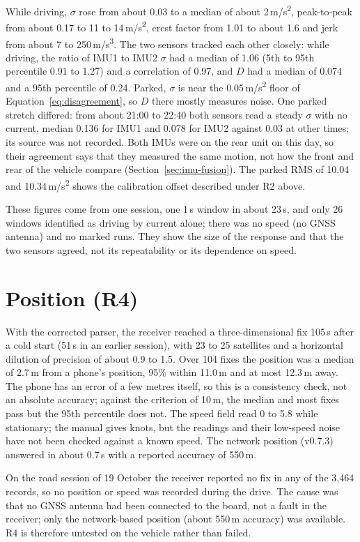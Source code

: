 While driving, $\sigma$ rose from about 0.03 to a median of about 2\,m/s\textsuperscript{2}, peak-to-peak from about 0.17 to 11 to 14\,m/s\textsuperscript{2}, crest factor from 1.01 to about 1.6 and jerk from about 7 to 250\,m/s\textsuperscript{3}. The two sensors tracked each other closely: while driving, the ratio of IMU1 to IMU2 $\sigma$ had a median of 1.06 (5th to 95th percentile 0.91 to 1.27) and a correlation of 0.97, and $D$ had a median of 0.074 and a 95th percentile of 0.24. Parked, $\sigma$ is near the 0.05\,m/s\textsuperscript{2} floor of Equation~\ref{eq:disagreement}, so $D$ there mostly measures noise. One parked stretch differed: from about 21:00 to 22:40 both sensors read a steady $\sigma$ with no current, median 0.136 for IMU1 and 0.078 for IMU2 against 0.03 at other times; its source was not recorded. Both IMUs were on the rear unit on this day, so their agreement says that they measured the same motion, not how the front and rear of the vehicle compare (Section~\ref{sec:imu-fusion}). The parked RMS of 10.04 and 10.34\,m/s\textsuperscript{2} shows the calibration offset described under R2 above.

These figures come from one session, one 1\,s window in about 23\,s, and only 26 windows identified as driving by current alone; there was no speed (no GNSS antenna) and no marked runs. They show the size of the response and that the two sensors agreed, not its repeatability or its dependence on speed.

\section{Position (R4)}
\label{sec:resx-gnss}

With the corrected parser, the receiver reached a three-dimensional fix 105\,s after a cold start (51\,s in an earlier session), with 23 to 25 satellites and a horizontal dilution of precision of about 0.9 to 1.5. Over 104 fixes the position was a median of 2.7\,m from a phone's position, 95\% within 11.0\,m and at most 12.3\,m away. The phone has an error of a few metres itself, so this is a consistency check, not an absolute accuracy; against the criterion of 10\,m, the median and most fixes pass but the 95th percentile does not. The speed field read 0 to 5.8 while stationary; the manual gives knots, but the readings and their low-speed noise have not been checked against a known speed. The network position (v0.7.3) answered in about 0.7\,s with a reported accuracy of 550\,m.

On the road session of 19 October the receiver reported no fix in any of the 3,464 records, so no position or speed was recorded during the drive. The cause was that no GNSS antenna had been connected to the board, not a fault in the receiver; only the network-based position (about 550\,m accuracy) was available. R4 is therefore untested on the vehicle rather than failed.

